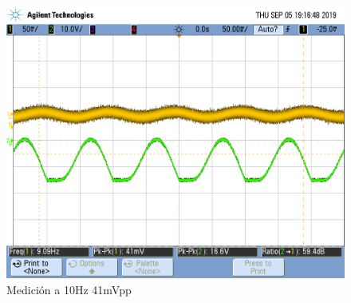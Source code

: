 \begin{figure}[H]
\centering
\includegraphics[width=\textwidth]{Ejercicio4/FOTOS-TP2-TC-EJ4/SaturaNoCompensado41}
\caption{Medición a 10Hz 41mVpp}
\end{figure}

